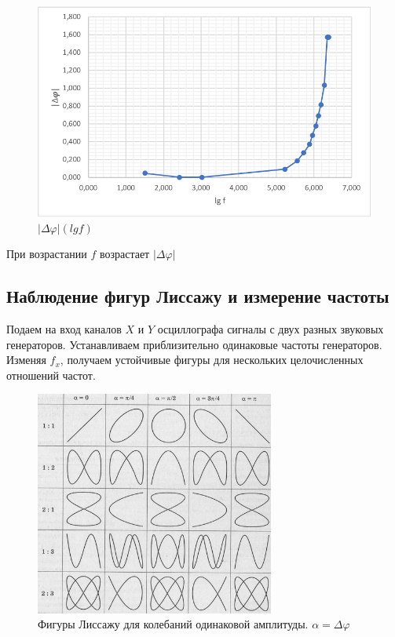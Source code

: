 \documentclass[a4paper,12pt]{article} %
\begin{document}
\begin{figure}[!h]
\begin{center}
\includegraphics[width=1\textwidth]{3}
\end{center}
\caption{$|\Delta\varphi|(lg f)$  } \label{dz3}
\end{figure}
\newpage
При возрастании $f$ возрастает $|\Delta\varphi|$


\subsection{Наблюдение фигур Лиссажу и измерение частоты}

Подаем на вход каналов $X$ и $Y$ осциллографа сигналы с двух разных звуковых генераторов. Устанавливаем приблизительно одинаковые частоты генераторов. Изменяя $f_x$, получаем устойчивые фигуры для нескольких целочисленных отношений частот.
\begin{figure}[!h]
\begin{center}
\includegraphics[width=0.7\textwidth]{5}
\end{center}
\caption{Фигуры Лиссажу для колебаний одинаковой амплитуды. $\alpha = \Delta\varphi$} \label{dz3}
\end{figure}
\end{document}
